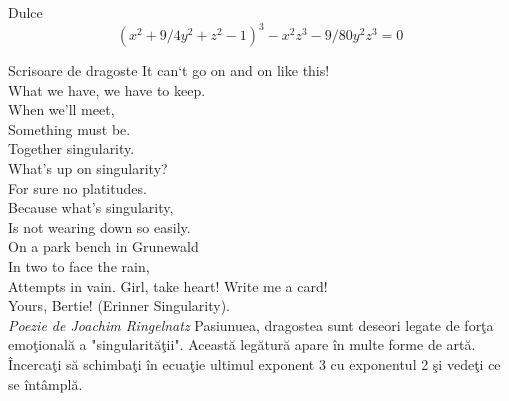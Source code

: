 \begin{surferPage}{Dulce}
\[(x^2+ 9/4y^2	+ z^2- 1)^3- x^2z^3	- 9/80y^2z^3	= 0\]

\singlespacing
Scrisoare de dragoste
\singlespacing
It can`t go on and on like this!\\
What we have, we have to keep.\\
When we'll meet,\\
Something must be.\\
Together singularity.\\
What's up on singularity?\\
For sure no platitudes.\\
Because what's singularity,\\
Is not wearing down so easily.\\
On a park bench in Grunewald\\
In two to face the rain,\\
Attempts in vain. Girl, take heart! Write me a card!\\
Yours, Bertie! (Erinner Singularity).\\
{\it Poezie de Joachim Ringelnatz}
\singlespacing
Pasiunuea, dragostea sunt deseori legate de for\c ta emo\c tional\u a a "singularit\u a\c tii". Aceast\u a leg\u atur\u a apare \^in multe forme de
art\u a.
\singlespacing
\^Incerca\c ti s\u a schimba\c ti \^in ecua\c tie ultimul exponent 3 cu exponentul 2 \c si vede\c ti ce se \^int\^ampl\u a.
\end{surferPage}
